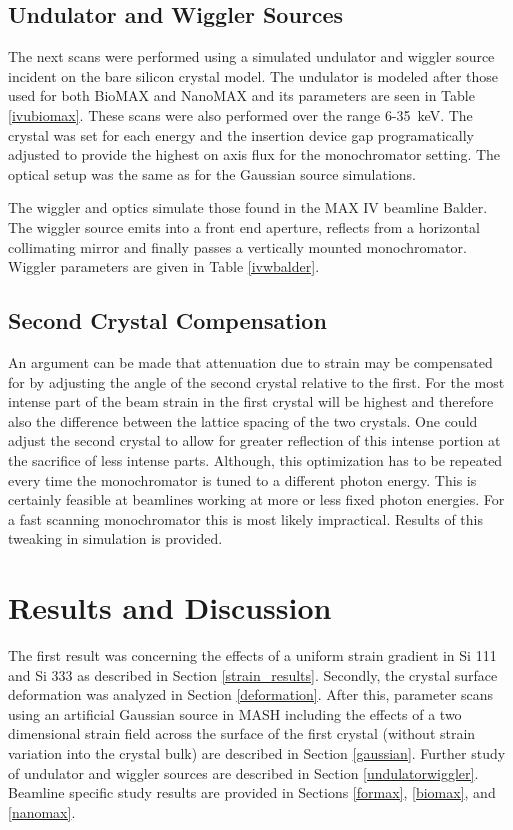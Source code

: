 \documentclass[preprint]{iucr}              %
\begin{document}
\subsection{Undulator and Wiggler Sources}\label{undulatorsource}
The next scans were performed using a simulated undulator and wiggler source incident on the bare silicon crystal model. The undulator is modeled after those used for both BioMAX and NanoMAX and its parameters are seen in Table \ref{ivubiomax}. These scans were also performed over the range 6-35~keV. The crystal was set for each energy and the insertion device gap programatically adjusted to provide the highest on axis flux for the monochromator setting. The optical setup was the same as for the Gaussian source simulations.

The wiggler and optics simulate those found in the MAX IV beamline Balder. The wiggler source emits into a front end aperture, reflects from a horizontal collimating mirror and finally passes a vertically mounted monochromator. Wiggler parameters are given in Table \ref{ivwbalder}.








\subsection{Second Crystal Compensation}

An argument can be made that attenuation due to strain may be compensated for by adjusting the angle of the second crystal relative to the first. For the most intense part of the beam strain in the first crystal will be highest and therefore also the difference between the lattice spacing of the two crystals. One could adjust the second crystal to allow for greater reflection of this intense portion at the sacrifice of less intense parts. Although, this optimization has to be repeated every time the monochromator is tuned to a different photon energy. This is certainly feasible at beamlines working at more or less fixed photon energies. For a fast scanning monochromator this is most likely impractical. Results of this tweaking in simulation is provided.

\section{Results and Discussion}

The first result was concerning the effects of a uniform strain gradient in Si 111 and Si 333 as described in Section \ref{strain_results}. Secondly, the crystal surface deformation was analyzed in Section \ref{deformation}. After this, parameter scans using an artificial Gaussian source in MASH including the effects of a two dimensional strain field across the surface of the first crystal (without strain variation into the crystal bulk) are described in Section \ref{gaussian}. Further study of undulator and wiggler sources are described in Section \ref{undulatorwiggler}. Beamline specific study results are provided in Sections \ref{formax}, \ref{biomax}, and \ref{nanomax}.
\end{document}
